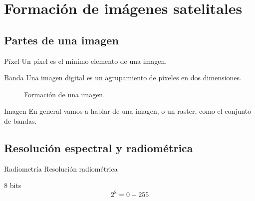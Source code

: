 \section{Formación de imágenes satelitales}
\subsection{Partes de una imagen}

\begin{frame}{}
\begin{block}{Píxel}
  Un píxel es el mínimo elemento de una imagen. 
\end{block}\pause
\begin{block}{Banda}
  Una imagen digital es un agrupamiento de píxeles en dos dimensiones. 
\end{block}
\end{frame}

\begin{frame}{}
  \begin{figure}
    \centering
    \caption{Formación de una imagen.}
    \label{}
  \end{figure}
\end{frame}



\begin{frame}{}
  \begin{block}{Imagen}
    En general vamos a hablar de una imagen, o un raster, como el conjunto de bandas.
  \end{block}
\end{frame}

\subsection{Resolución espectral y radiométrica}

\begin{frame}{}
  \begin{block}{Radiometría}
    Resolución radiométrica
  \end{block}
\end{frame}

\begin{frame}{}
  \begin{block}{8 bits}
   \begin{equation}
            2^8 = 0-255
        \end{equation}
  \end{block}
\end{frame}

